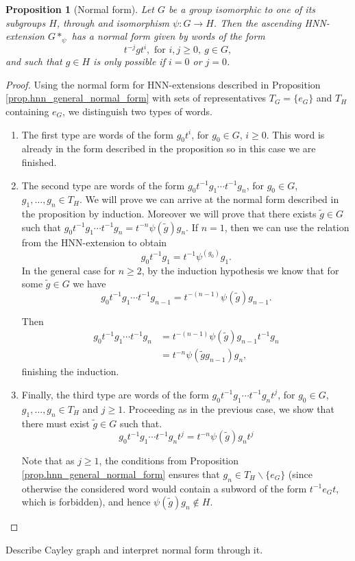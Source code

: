 \documentclass[letterpaper,10pt]{article}
\theoremstyle{plain}
\newtheorem{proposition}[theorem]{Proposition}
\begin{document}
	
	\begin{proposition}[Normal form]\label{prop.normalform_hnn_particular}
		Let $G$ be a group isomorphic to one of its subgroups $H$, through and isomorphism $\psi:G\to H$. Then the ascending HNN-extension $G*_{\psi}$ has a normal form given by words of the form $$t^{-j}gt^{i}, \text{ for }i,j\ge 0, \ g\in G,$$
		and such that $g\in H$ is only possible if $i=0$ or $j=0$.
	\end{proposition}
\begin{proof}
	Using the normal form for HNN-extensions described in Proposition \ref{prop.hnn_general_normal_form} with sets of representatives $T_G=\{e_G\}$ and $T_H$ containing $e_G$, we distinguish two types of words.
	
	\begin{enumerate}[1.]
		\item The first type are words of the form $g_0t^i$, for $g_0\in G$, $i\ge 0$. This word is already in the form described in the proposition so in this case we are finished.
		\item The second type are words of the form $g_0t^{-1}g_1\cdots t^{-1}g_n$, for $g_0\in G$, $g_1,\ldots,g_n\in T_H$. We will prove we can arrive at the normal form described in the proposition by induction. Moreover we will prove that there exists $\tilde{g}\in G$ such that $g_0t^{-1}g_1\cdots t^{-1}g_n=t^{-n}\psi(\tilde{g})g_n$. If $n=1$, then we can use the relation from the HNN-extension to obtain
		$$
		g_0t^{-1}g_1=t^{-1}\psi^(g_0)g_1.
		$$
		In the general case for $n\ge 2$, by the induction hypothesis we know that for some $\tilde{g}\in G$ we have $$g_0t^{-1}g_1\cdots t^{-1}g_{n-1}=t^{-(n-1)}\psi(\tilde{g})g_{n-1}.$$
		
		Then
		\begin{align*}
		g_0t^{-1}g_1\cdots t^{-1}g_n&=t^{-(n-1)}\psi(\tilde{g})g_{n-1}t^{-1}g_n\\
		&=t^{-n}\psi(\tilde{g}g_{n-1})g_n,
		\end{align*}
		finishing the induction.
		\item Finally, the third type are words of the form $g_0t^{-1}g_1\cdots t^{-1}g_nt^{j}$, for $g_0\in G$, $g_1,\ldots,g_n\in T_H$ and $j\ge 1$. Proceeding as in the previous case, we show that there must exist $\tilde{g}\in G$ such that.
		$$
		g_0t^{-1}g_1\cdots t^{-1}g_nt^{j}=t^{-n}\psi(\tilde{g})g_{n}t^{j}
		$$
		
		Note that as $j\ge 1$, the conditions from Proposition \ref{prop.hnn_general_normal_form} ensures that $g_n\in T_H\backslash\{e_G \}$ (since otherwise the considered word would contain a subword of the form $t^{-1}e_Gt$, which is forbidden), and hence $\psi(\tilde{g})g_{n}\notin H$.
	\end{enumerate}
\end{proof}
Describe Cayley graph and interpret normal form through it. 
\end{document}
